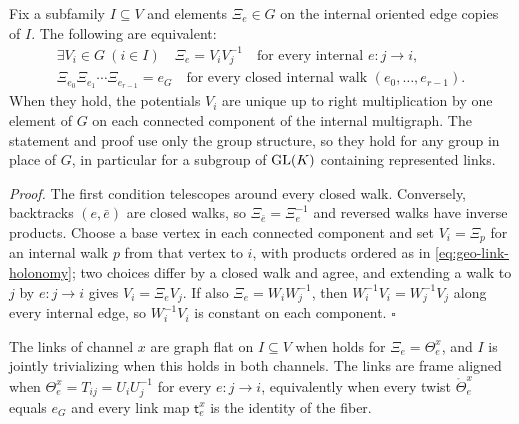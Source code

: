 \label{prop:gauss-coboundary-trivialization}
Fix a subfamily $I\subseteq V$ and elements $\Xi_e\in G$ on the internal oriented edge copies of $I$.
The following are equivalent:
\begin{equation}
\begin{gathered}
\exists V_i\in G\ (i\in I)
\quad
\Xi_e=V_iV_j^{-1}
\quad\text{for every internal }e:j\to i,\\
\Xi_{e_0}\Xi_{e_1}\cdots\Xi_{e_{r-1}}=e_G
\quad\text{for every closed internal walk }(e_0,\ldots,e_{r-1}).
\end{gathered}
\label{eq:geo-trivializing-criterion}
\end{equation}
When they hold, the potentials $V_i$ are unique up to right multiplication by one element of $G$ on
each connected component of the internal multigraph. The statement and proof use only the group
structure, so they hold for any group in place of $G$, in particular for a subgroup of $\mathrm{GL}(K)$
containing represented links. 

\noindent\emph{Proof.}
The first condition telescopes around every closed walk. Conversely, backtracks
$(e,\bar e)$ are closed walks, so $\Xi_{\bar e}=\Xi_e^{-1}$ and reversed walks have inverse products.
Choose a base vertex in each connected component and set $V_i=\Xi_{p}$ for an internal walk $p$ from
that vertex to $i$, with products ordered as in \eqref{eq:geo-link-holonomy}; two choices differ by a
closed walk and agree, and extending a walk to $j$ by $e:j\to i$ gives $V_i=\Xi_eV_j$. If also
$\Xi_e=W_iW_j^{-1}$, then $W_i^{-1}V_i=W_j^{-1}V_j$ along every internal edge, so $W_i^{-1}V_i$ is
constant on each component. \hfill$\square$

The links of channel $x$ are graph flat on $I\subseteq V$ when 
holds for $\Xi_e=\Theta_e^x$, and $I$ is jointly trivializing when this holds in both channels. The
links are frame aligned\label{hyp:geo-flat-links} when $\Theta_e^x=T_{ij}=U_iU_j^{-1}$ for every
$e:j\to i$,\label{eq:geo-flat-regime} equivalently when every twist $\mathring\Theta_e^x$ equals $e_G$
and every link map $\mathsf t_e^x$ is the identity of the fiber.

